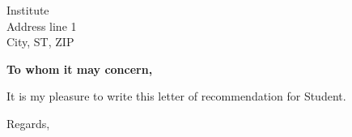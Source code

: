 \documentclass{letter}
\begin{document}


\begin{letter}{ Institute \\ Address line 1 \\ City, ST, ZIP} %


\opening{\textbf{To whom it may concern,}}

It is my pleasure to write this letter of recommendation for Student.

\vspace{2\parskip} %

\closing{Regards,}

\vspace{2\parskip} %




\end{letter}
\end{document}
